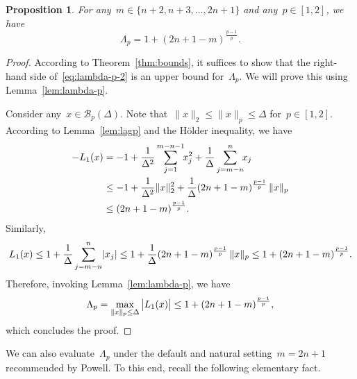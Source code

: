 \documentclass{article}
\numberwithin{equation}{section}
\theoremstyle{definition}
\theoremstyle{plain}
\newtheorem{proposition}{Proposition}[section]
\theoremstyle{remark}
\newcommand*{\abs}[2][]{#1\lvert#2#1\rvert}
\newcommand*{\lagp}[1][]{L\ifblank{#1}{}{_{#1}}}
\newcommand*{\norm}[2][]{#1\lVert#2#1\rVert}
\newcommand*{\set}[2][]{#1\{#2#1\}}
\begin{document}
\begin{proposition}
    \label{prop:lambda-p-2}
    For any~$m \in \set{n + 2, n + 3, \dots, 2n + 1}$ and any~$p\in[1,2]$, we have
    \begin{equation}
        \label{eq:lambda-p-2}
        \Lambda_p = 1 + (2n + 1 - m)^{\frac{p-1}{p}}.
    \end{equation}
\end{proposition}

\begin{proof}
    According to Theorem~\ref{thm:bounds}, it suffices to show that the right-hand side of~\eqref{eq:lambda-p-2} is an upper bound for~$\Lambda_p$.
    We will prove this using Lemma~\ref{lem:lambda-p}.

    Consider any~$x \in \mathcal{B}_p(\Delta)$. Note that~$\norm{x}_2 \le\norm{x}_p \le \Delta $ for~$p\in[1,2]$.
    According to Lemma~\ref{lem:lagp} and the H\"older inequality, we have
    \begin{align}
        -\lagp[1](x) &= -1 + \frac{1}{\Delta^2} \sum_{j = 1}^{m - n - 1} \!\! x_j^2 + \frac{1}{\Delta} \sum_{j = m - n}^n \!\! x_j \nonumber\\
        &\le -1 + \frac{1}{\Delta^2}\norm{x}_2^2 + \frac{1}{\Delta} (2n+1-m)^{\frac{p-1}{p}}\, \norm{x}_p \nonumber \\
        & \le (2n+1-m)^{\frac{p-1}{p}} \nonumber. %
    \end{align}
    Similarly,
    \begin{equation*}
        \lagp[1](x) \le 1 + \frac{1}{\Delta}\sum_{j = m - n}^n \abs{x_j} \le 1 + \frac{1}{\Delta}
        (2n + 1 - m)^{\frac{p-1}{p}} \,\norm{x}_p \le 1 + (2n + 1 - m)^{\frac{p-1}{p}}.
    \end{equation*}
    Therefore, invoking Lemma~\ref{lem:lambda-p}, we have
    \begin{equation*}
        \Lambda_p = \max_{\norm{x}_p \le \Delta} \abs[\big]{\lagp[1](x)} \le 1 + (2n + 1 - m)^{\frac{p-1}{p}},
    \end{equation*}
    which concludes the proof.
\end{proof}

We can also evaluate~$\Lambda_p$ under the default and natural setting~$m = 2n+1$ recommended by Powell.
To this end, recall the following elementary fact.
\end{document}

